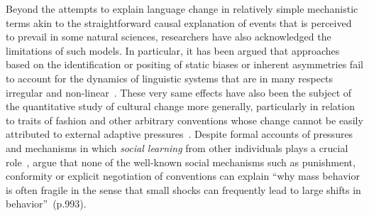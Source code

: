 Beyond the attempts to explain language change in relatively simple mechanistic terms akin to the straightforward causal explanation of events that is perceived to prevail in some natural sciences, researchers have also acknowledged the limitations of such models.
In particular, it has been argued that approaches based on the identification or positing of static biases or inherent asymmetries fail to account for the dynamics of linguistic systems that are in many respects irregular and non-linear~\citep[see e.g.][]{Larsen-Freeman1997,Fortescue2006}.
These very same effects have also been the subject of the quantitative study of cultural change more generally, particularly in relation to traits of fashion and other arbitrary conventions whose change cannot be easily attributed to external adaptive pressures~\citep{Acerbi2012}. %
Despite formal accounts of pressures and mechanisms in which \emph{social learning} from other individuals plays a crucial role~\citep[see e.g.][]{Boyd1985}, \citeauthor{Bikhchandani1992} argue that none of the well-known social mechanisms such as punishment, conformity or explicit negotiation of conventions can explain ``why mass behavior is often fragile in the sense that small shocks can frequently lead to large shifts in behavior''~(p.993).

